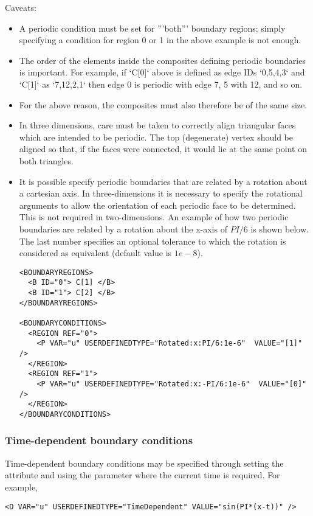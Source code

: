 Caveats:
\begin{itemize}
\item A periodic condition must be set for '''both''' boundary regions; simply
 specifying a condition for region 0 or 1 in the above example is not enough.
\item The order of the elements inside the composites defining periodic
boundaries is important. For example, if `C[0]` above is defined as edge IDs 
`{0,5,4,3}` and `C[1]` as `{7,12,2,1}` then edge 0 is periodic with edge 7, 5 
with 12, and so on.
\item For the above reason, the composites must also therefore be of the same
size.
\item In three dimensions, care must be taken to correctly align triangular
faces which are intended to be periodic. The top (degenerate) vertex should be 
aligned so that, if the faces were connected, it would lie at the same point on 
both triangles.

\item It is possible specify periodic boundaries that are related by a
  rotation about a cartesian axis. In three-dimensions it is necessary
  to specify the rotational arguments to allow the orientation of each
  periodic face to be determined. This is not required in
  two-dimensions. An example of how two periodic boundaries are
  related by a rotation about the x-axis of $PI/6$ is shown below. The
  last number specifies an optional tolerance to which the rotation is
  considered as equivalent (default value is $1e-8$).
  
  \begin{lstlisting}[style=XMLStyle]
<BOUNDARYREGIONS>
  <B ID="0"> C[1] </B>
  <B ID="1"> C[2] </B>
</BOUNDARYREGIONS>

<BOUNDARYCONDITIONS>
  <REGION REF="0">
    <P VAR="u" USERDEFINEDTYPE="Rotated:x:PI/6:1e-6"  VALUE="[1]" />
  </REGION>
  <REGION REF="1">
    <P VAR="u" USERDEFINEDTYPE="Rotated:x:-PI/6:1e-6"  VALUE="[0]" />
  </REGION>
</BOUNDARYCONDITIONS>
\end{lstlisting}


\end{itemize}

\subsubsection{Time-dependent boundary conditions}
Time-dependent boundary conditions may be specified through setting the
 attribute and using the parameter  where the
current time is required. For example,
\begin{lstlisting}[style=XMLStyle]
<D VAR="u" USERDEFINEDTYPE="TimeDependent" VALUE="sin(PI*(x-t))" />
\end{lstlisting}

